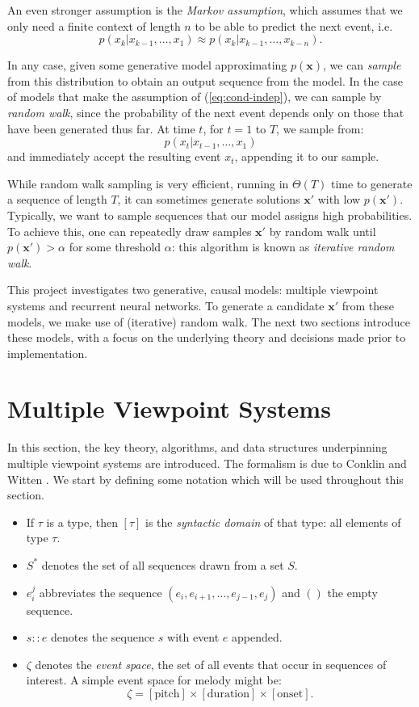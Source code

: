 \documentclass[12pt,a4paper,twoside,openright]{report}
\newcommand{\vect}[1]{\boldsymbol{\mathbf{#1}}}
\begin{document}
An even stronger assumption is the \emph{Markov assumption}, which assumes that
we only need a finite context of length $n$ to be able to predict the next
event, i.e.
\begin{equation}
  p(x_k | x_{k-1}, \ldots, x_1) \approx p(x_k | x_{k-1}, \ldots, x_{k-n}).
  \label{eq:markov-asmptn}
\end{equation} 

In any case, given some generative model approximating $p(\vect{x})$, we can
\emph{sample} from this distribution to obtain an output sequence from the
model. In the case of models that make the assumption of (\ref{eq:cond-indep}),
we can sample by \emph{random walk}, since the probability of the next event
depends only on those that have been generated thus far. At time $t$, for $t =
1$ to $T$, we sample from:
$$ p(x_t | x_{t-1}, \ldots, x_1) $$
and immediately accept the resulting event $x_t$, appending it to our sample.

While random walk sampling is very efficient, running in $\Theta(T)$ time to
generate a sequence of length $T$, it can sometimes generate solutions
$\vect{x}'$ with low $p(\vect{x}')$. Typically, we want to sample sequences that
our model assigns high probabilities. To achieve this, one can 
repeatedly draw samples $\vect{x}'$ by random walk until $p(\vect{x}') > \alpha$
for some threshold $\alpha$: this algorithm is known as \emph{iterative random
walk}.

This project investigates two generative, causal models: multiple viewpoint
systems and recurrent neural networks. To generate a candidate $\vect{x}'$ from
these models, we make use of (iterative) random walk. The next two sections
introduce these models, with a focus on the underlying theory and decisions made
prior to implementation.

\section{Multiple Viewpoint Systems}

In this section, the key theory, algorithms, and data structures underpinning
multiple viewpoint systems are introduced. The formalism is due to Conklin and
Witten \cite{conklin1995viewpoints}. We start by defining some notation which
will be used throughout this section.

\begin{itemize}[itemsep=0mm]
  \item If $\tau$ is a type, then $[\tau]$ is the \emph{syntactic domain} of
    that type: all elements of type $\tau$.   
  \item $S^*$ denotes the set of all sequences drawn from a set $S$.
  \item $e_i^j$ abbreviates the sequence $(e_i,e_{i+1},\ldots,e_{j-1},e_j)$ and
    $()$ the empty sequence.
  \item $s :: e$ denotes the sequence $s$ with event $e$ appended.
  \item $\zeta$ denotes the \emph{event space}, the set of all events that occur
    in sequences of interest. A simple event space for melody might be:
    $$ \zeta = [\mathrm{pitch}] \times [\mathrm{duration}] \times [\mathrm{onset}]. $$
\end{itemize}
\end{document}
